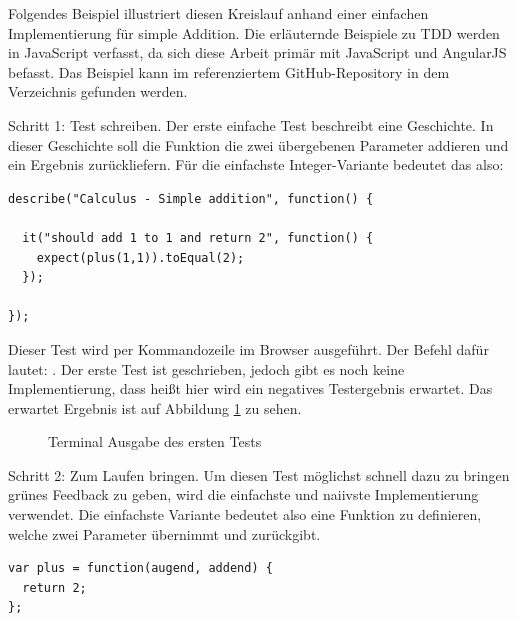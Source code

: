 Folgendes Beispiel illustriert diesen Kreislauf anhand einer einfachen Implementierung für simple Addition.
Die erläuternde Beispiele zu TDD werden in JavaScript verfasst, da sich diese Arbeit primär mit JavaScript und AngularJS befasst.
Das Beispiel kann im referenziertem GitHub-Repository in dem Verzeichnis  gefunden werden.

Schritt 1: Test schreiben.
Der erste einfache Test beschreibt eine Geschichte. In dieser Geschichte soll die Funktion  die zwei übergebenen Parameter addieren und ein Ergebnis zurückliefern. Für die einfachste Integer-Variante bedeutet das also: 

\begin{lstlisting}[style=verbo]
describe("Calculus - Simple addition", function() {

  it("should add 1 to 1 and return 2", function() {
    expect(plus(1,1)).toEqual(2);
  });

});
\end{lstlisting}

Dieser Test wird per Kommandozeile im Browser  ausgeführt. Der Befehl dafür lautet: . Der erste Test ist geschrieben, jedoch gibt es noch keine Implementierung, dass heißt hier wird ein negatives Testergebnis erwartet. Das erwartet Ergebnis ist auf Abbildung \ref{figure:tdd-simple-step-1-1} zu sehen.

\begin{figure}[H]
  \centering
  \caption{Terminal Ausgabe des ersten Tests}
  \label{figure:tdd-simple-step-1-1}
\end{figure}

Schritt 2: Zum Laufen bringen.
Um diesen Test möglichst schnell dazu zu bringen grünes Feedback zu geben, wird die einfachste und naiivste Implementierung verwendet.
Die einfachste Variante bedeutet also eine Funktion zu definieren, welche zwei Parameter übernimmt und \glqq{2\grqq} zurückgibt.

\begin{lstlisting}[style=verbo]
var plus = function(augend, addend) {
  return 2;
};
\end{lstlisting}

